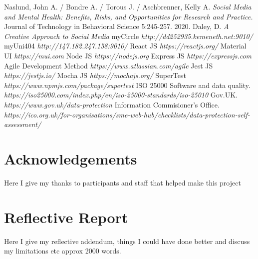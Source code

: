\documentclass[lettersize,journal]{IEEEtran}
\begin{document}
\begin{thebibliography}{}
	Naslund, John A. / Bondre A. / Torous J. / Aschbrenner, Kelly A. {\it{Social Media and Mental Health: Benefits, Risks, and Opportunities for Research and Practice.}} Journal of Technology in Behavioral Science 5:245-257.
	2020.
	Daley, D. {\it{A Creative Approach to Social Media}}
	myCircle
	{\it{http://dd252935.kemeneth.net:9010/}}
    myUni404
    {\it{http://147.182.247.158:9010/}}
	React JS
	{\it{https://reactjs.org/}}
	Material UI
	{\it{https://mui.com}}
	Node JS
	{\it{https://nodejs.org}}
	Express JS
	{\it{https://expressjs.com}}
	Agile Development Method
	{\it{https://www.atlassian.com/agile}}
	Jest JS
	{\it{https://jestjs.io/}}
	Mocha JS
	{\it{https://mochajs.org/}}
	SuperTest
	{\it{https://www.npmjs.com/package/supertest}}
	ISO 25000 Software and data quality.
	{\it{https://iso25000.com/index.php/en/iso-25000-standards/iso-25010}}
	Gov.UK. {\it{https://www.gov.uk/data-protection}}
	Information Commisioner's Office. {\it{https://ico.org.uk/for-organisations/sme-web-hub/checklists/data-protection-self-assessment/}}

\end{thebibliography}
\newpage
\newpage
\clearpage
\appendices
\newpage
\section{Acknowledgements}
Here I give my thanks to participants and staff that helped make this project


\section{Reflective Report}
	Here I give my reflective addendum, things I could have done better and discuss my limitations etc approx 2000 words.
\end{document}
